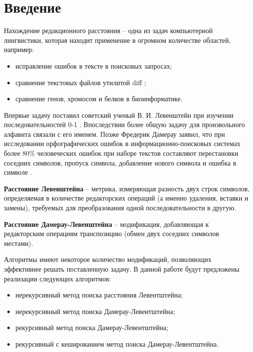 \chapter*{Введение}

Нахождение редакционного расстояния -- одна из задач компьютерной лингвистики, которая находит применение в огромном количестве областей, например:
\begin{itemize}
	\item исправление ошибок в тексте в поисковых запросах;
    \item сравнение текстовых файлов утилитой diff \cite{diff};
    \item сравнение генов, хромосом и белков в биоинформатике.
\end{itemize}

Впервые задачу поставил советский ученый В. И. Левенштейн при изучении последовательностей 0-1 \cite{levenshtein}.
Впоследствии более общую задачу для произвольного алфавита связали с его именем.
Позже Фредерик Дамерау заявил, что при исследовании орфографических ошибок в информационно-поисковых системах более 80\% человеческих ошибок при наборе текстов составляют перестановки соседних символов, пропуск символа, добавление нового символа и ошибка в символе \cite{damerau}.

\textbf{Расстояние Левенштейна} -- метрика, измеряющая разность двух строк символов, определяемая в количестве редакторских операций (а именно удаления, вставки и замены), требуемых для преобразования одной последовательности в другую.

\textbf{Расстояние Дамерау-Левенштейна} -- модификация, добавляющая к редакторским операциям транспозицию (обмен двух соседних символов местами).

Алгоритмы имеют некоторое количество модификаций, позволяющих эффективнее решать поставленную задачу.
В данной работе будут предложены реализации следующих алгоритмов:
\begin{itemize}
	\item нерекурсивный метод поиска расстояния Левентштейна;
    \item нерекурсивный метод поиска Дамерау-Левентштейна;
    \item рекурсивный метод поиска Дамерау-Левентштейна;
    \item рекурсивный с кешированием метод поиска Дамерау-Левентштейна.
\end{itemize}

\clearpage

